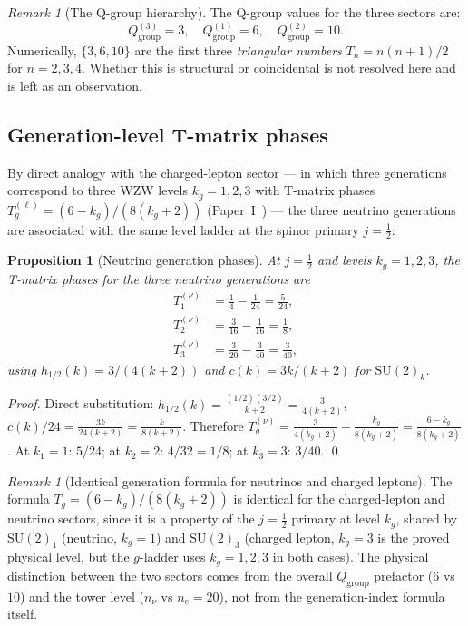 \documentclass[11pt,a4paper]{article}
\newtheorem{proposition}[theorem]{Proposition}
\theoremstyle{definition}\newtheorem{definition}[theorem]{Definition}
\theoremstyle{remark}
\newtheorem{remark}[theorem]{Remark}
\newcommand{\SU}{\mathrm{SU}}
\begin{document}
\begin{remark}[The Q-group hierarchy]
\label{P17:rem:qgroup_hierarchy}
The Q-group values for the three sectors are:
\[
  Q_{\mathrm{group}}^{(3)} = 3, \quad
  Q_{\mathrm{group}}^{(1)} = 6, \quad
  Q_{\mathrm{group}}^{(2)} = 10.
\]
Numerically, $\{3,6,10\}$ are the first three \emph{triangular numbers}
$T_n=n(n+1)/2$ for $n=2,3,4$. Whether this is structural or
coincidental is not resolved here and is left as an observation.
\end{remark}

\subsection{Generation-level T-matrix phases}
\label{P17:sec:wzw_generation}

By direct analogy with the charged-lepton sector --- in which three
generations correspond to three WZW levels $k_g=1,2,3$ with T-matrix
phases $T_g^{(\ell)}=(6-k_g)/(8(k_g+2))$ (Paper~I~\cite{Paper1}) ---
the three neutrino generations are associated with the same level
ladder at the spinor primary $j=\tfrac12$:

\begin{proposition}[Neutrino generation phases]
\label{P17:prop:nu_Tphases}
At $j=\tfrac12$ and levels $k_g=1,2,3$, the T-matrix phases for the
three neutrino generations are
\begin{align*}
  T_1^{(\nu)} &= \tfrac{1}{4} - \tfrac{1}{24} = \tfrac{5}{24},\\
  T_2^{(\nu)} &= \tfrac{3}{16} - \tfrac{1}{16} = \tfrac{1}{8},\\
  T_3^{(\nu)} &= \tfrac{3}{20} - \tfrac{3}{40} = \tfrac{3}{40},
\end{align*}
using $h_{1/2}(k)=3/(4(k+2))$ and $c(k)=3k/(k+2)$ for $\SU(2)_k$.
\end{proposition}

\begin{proof}
Direct substitution: $h_{1/2}(k) = \frac{(1/2)(3/2)}{k+2} = \frac{3}{4(k+2)}$,
$c(k)/24 = \frac{3k}{24(k+2)} = \frac{k}{8(k+2)}$.
Therefore
$T_g^{(\nu)}=\frac{3}{4(k_g+2)}-\frac{k_g}{8(k_g+2)}=\frac{6-k_g}{8(k_g+2)}$.
At $k_1=1$: $5/24$; at $k_2=2$: $4/32=1/8$; at $k_3=3$: $3/40$. \qed
\end{proof}

\begin{remark}[Identical generation formula for neutrinos and charged leptons]
\label{P17:rem:same_ladder}
The formula $T_g = (6-k_g)/(8(k_g+2))$ is identical for the
charged-lepton and neutrino sectors, since it is a property of the
$j=\tfrac12$ primary at level $k_g$, shared by $\SU(2)_1$ (neutrino,
$k_g=1$) and $\SU(2)_3$ (charged lepton, $k_g=3$ is the proved
physical level, but the $g$-ladder uses $k_g=1,2,3$ in both cases).
The physical distinction between the two sectors comes from the
overall $Q_{\mathrm{group}}$ prefactor ($6$ vs $10$) and the
tower level ($n_\nu$ vs $n_e=20$), not from the generation-index
formula itself.
\end{remark}
\end{document}
